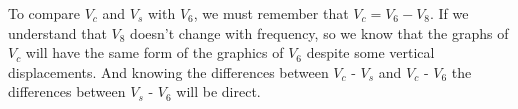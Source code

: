 To compare $V_c$ and $V_s$ with $V_6$, we must remember that $V_c = V_6-V_8$. If we understand that $V_8$ doesn't change with frequency, so we know that the graphs of
 $V_c$ will have the same form of the graphics of $V_6$ despite some vertical displacements. And knowing the differences between $V_c$ - $V_s$ and $V_c$ - $V_6$
the differences between $V_s$ - $V_6$ will be direct.



